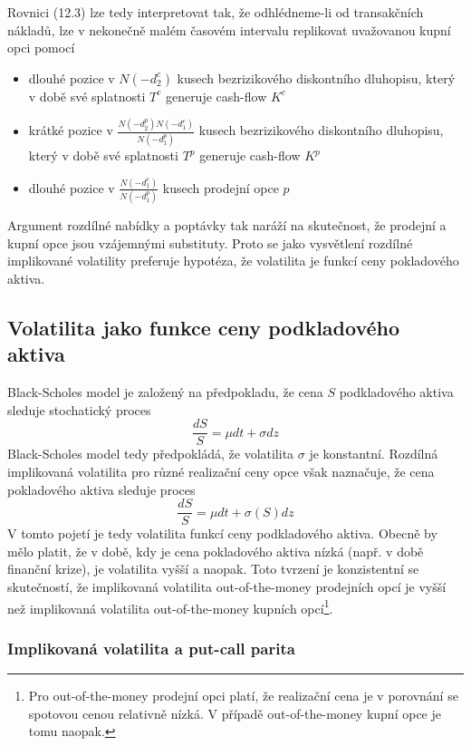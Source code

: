 \documentclass[a4paper]{book}
\begin{document}
Rovnici (12.3) lze tedy interpretovat tak, že odhlédneme-li od transakčních nákladů, lze v nekonečně malém časovém intervalu replikovat uvažovanou kupní opci pomocí
\begin{itemize}
\item dlouhé pozice v $N(-d_2^c)$ kusech bezrizikového diskontního dluhopisu, který v době své splatnosti $T^c$ generuje cash-flow $K^c$
\item krátké pozice v $\frac{N(-d_2^p)N(-d_1^c)}{N(-d_1^p)}$ kusech bezrizikového diskontního dluhopisu, který v době své splatnosti $T^p$ generuje cash-flow $K^p$
\item dlouhé pozice v $\frac{N(-d_1^c)}{N(-d_1^p)}$ kusech prodejní opce $p$
\end{itemize}
Argument rozdílné nabídky a poptávky tak naráží na skutečnost, že prodejní a kupní opce jsou vzájemnými substituty. Proto se jako vysvětlení rozdílné implikované volatility preferuje hypotéza, že volatilita je funkcí ceny pokladového aktiva.

\subsection{Volatilita jako funkce ceny podkladového aktiva}

Black-Scholes model je založený na předpokladu, že cena $S$ podkladového aktiva sleduje stochatický proces
\begin{equation*}
\frac{dS}{S} = \mu dt + \sigma d z
\end{equation*}
Black-Scholes model tedy předpokládá, že volatilita $\sigma$ je konstantní. Rozdílná implikovaná volatilita pro různé realizační ceny opce však naznačuje, že cena pokladového aktiva sleduje proces
\begin{equation*}
\frac{dS}{S} = \mu dt + \sigma(S) dz
\end{equation*}
V tomto pojetí je tedy volatilita funkcí ceny podkladového aktiva. Obecně by mělo platit, že v době, kdy je cena pokladového aktiva nízká (např. v době finanční krize), je volatilita vyšší a naopak. Toto tvrzení je konzistentní se skutečností, že implikovaná volatilita out-of-the-money prodejních opcí je vyšší než implikovaná volatilita out-of-the-money kupních opcí\footnote{Pro out-of-the-money prodejní opci platí, že realizační cena je v porovnání se spotovou cenou relativně nízká. V případě out-of-the-money kupní opce je tomu naopak.}.

\subsubsection{Implikovaná volatilita a put-call parita}
\end{document}
